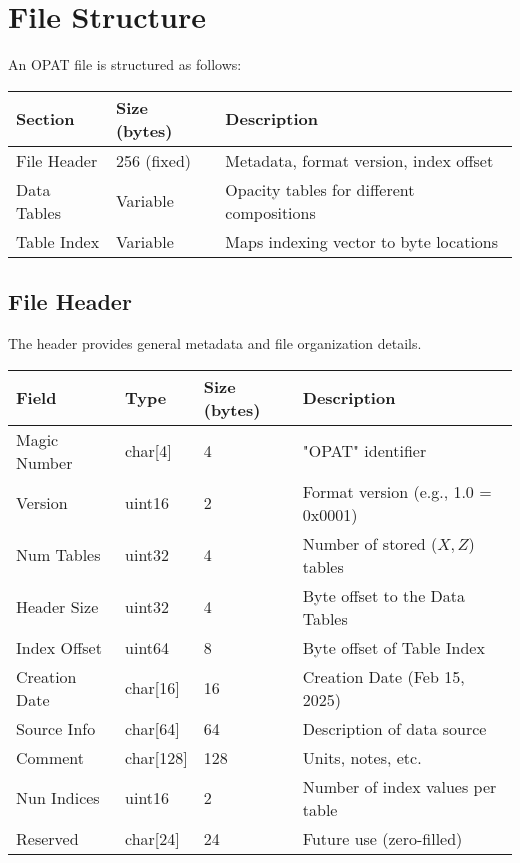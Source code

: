 \documentclass{article}
\begin{document}
\section{File Structure}
An OPAT file is structured as follows:

\begin{center}
\begin{tabular}{|l|l|l|}
\hline
\textbf{Section} & \textbf{Size (bytes)} & \textbf{Description} \\
\hline
File Header & 256 (fixed) & Metadata, format version, index offset \\
Data Tables & Variable & Opacity tables for different compositions \\
Table Index & Variable & Maps indexing vector to byte locations \\
\hline
\end{tabular}
\end{center}

\subsection{File Header}
The header provides general metadata and file organization details.

\begin{longtable}{|l|l|l|l|}
\hline
\textbf{Field} & \textbf{Type} & \textbf{Size (bytes)} & \textbf{Description} \\
\hline
Magic Number & char[4] & 4 & "OPAT" identifier \\
Version & uint16 & 2 & Format version (e.g., 1.0 = 0x0001) \\
Num Tables & uint32 & 4 & Number of stored ($X, Z$) tables \\
Header Size & uint32 & 4 & Byte offset to the Data Tables \\
Index Offset & uint64 & 8 & Byte offset of Table Index \\
Creation Date & char[16] & 16 & Creation Date (Feb 15, 2025) \\
Source Info & char[64] & 64 & Description of data source \\
Comment & char[128] & 128 & Units, notes, etc. \\
Nun Indices & uint16 & 2 & Number of index values per table \\
Reserved & char[24] & 24 & Future use (zero-filled) \\
\hline
\end{longtable}
\end{document}
